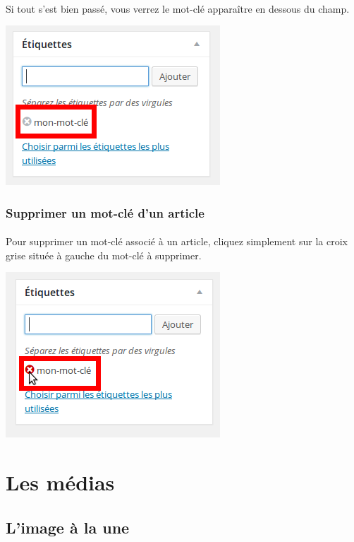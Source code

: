 \documentclass[10pt,a4paper]{article}
\begin{document}
\paragraph{}Si tout s'est bien passé, vous verrez le mot-clé apparaître en dessous du champ.
\begin{center}
\includegraphics[scale=0.3]{img/0096.png}
\end{center}
\subsubsection{Supprimer un mot-clé d'un article}
\paragraph{}Pour supprimer un mot-clé associé à un article, cliquez simplement sur la croix grise située à gauche du mot-clé à supprimer.
\begin{center}
\includegraphics[scale=0.3]{img/0097.png}
\end{center}
\newpage

\section{Les médias}
\subsection{L'image à la une}
\end{document}
